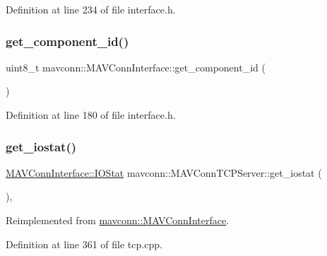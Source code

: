 Definition at line 234 of file interface.\+h.

\mbox{\label{group__mavconn_gada7ecc7f6cffa0ecfc17f88327953223}} 
\subsubsection{\texorpdfstring{get\_component\_id()}{get\_component\_id()}}
{\footnotesize\ttfamily uint8\+\_\+t mavconn\+::\+M\+A\+V\+Conn\+Interface\+::get\+\_\+component\+\_\+id (\begin{DoxyParamCaption}{ }\end{DoxyParamCaption})\hspace{0.3cm}{\ttfamily [inline]}}



Definition at line 180 of file interface.\+h.

\mbox{\label{group__mavconn_ga7fd83c9a2233baa30aff24b6f3c8dd25}} 
\subsubsection{\texorpdfstring{get\_iostat()}{get\_iostat()}\hspace{0.1cm}{\footnotesize\ttfamily [1/2]}}
{\footnotesize\ttfamily \mbox{\hyperlink{structmavconn_1_1MAVConnInterface_1_1IOStat}{M\+A\+V\+Conn\+Interface\+::\+I\+O\+Stat}} mavconn\+::\+M\+A\+V\+Conn\+T\+C\+P\+Server\+::get\+\_\+iostat (\begin{DoxyParamCaption}{ }\end{DoxyParamCaption})\hspace{0.3cm}{\ttfamily [override]}, {\ttfamily [virtual]}}



Reimplemented from \mbox{\hyperlink{group__mavconn_gab330e130b5cff0e1d6aa67742ffc79f4}{mavconn\+::\+M\+A\+V\+Conn\+Interface}}.



Definition at line 361 of file tcp.\+cpp.

\mbox{\label{group__mavconn_gab330e130b5cff0e1d6aa67742ffc79f4}} 
